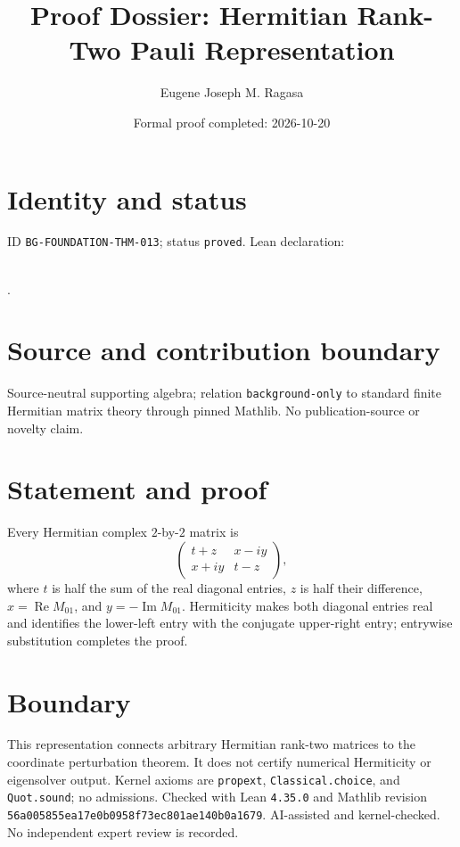 \documentclass[11pt]{article}
\title{Proof Dossier: Hermitian Rank-Two Pauli Representation}\author{Eugene Joseph M. Ragasa}\date{Formal proof completed: 2026-10-20}
\begin{document}
\maketitle
\section{Identity and status}
ID \texttt{BG-FOUNDATION-THM-013}; status \texttt{proved}. Lean declaration:
\par{}\\
{\tiny{}}.
\section{Source and contribution boundary}
Source-neutral supporting algebra; relation \texttt{background-only} to standard finite
Hermitian matrix theory through pinned Mathlib. No publication-source or novelty claim.
\section{Statement and proof}
Every Hermitian complex $2$-by-$2$ matrix is
\[
\begin{pmatrix}t+z&x-iy\\x+iy&t-z\end{pmatrix},
\]
where $t$ is half the sum of the real diagonal entries, $z$ is half their difference,
$x=\operatorname{Re}M_{01}$, and $y=-\operatorname{Im}M_{01}$. Hermiticity makes both
diagonal entries real and identifies the lower-left entry with the conjugate upper-right
entry; entrywise substitution completes the proof.
\section{Boundary}
This representation connects arbitrary Hermitian rank-two matrices to the coordinate
perturbation theorem. It does not certify numerical Hermiticity or eigensolver output.
Kernel axioms are \texttt{propext}, \texttt{Classical.choice}, and \texttt{Quot.sound}; no admissions. Checked with Lean \texttt{4.35.0} and Mathlib revision \texttt{56a005855ea17e0b0958f73ec801ae140b0a1679}. AI-assisted and kernel-checked. No independent expert review is recorded.
\end{document}
